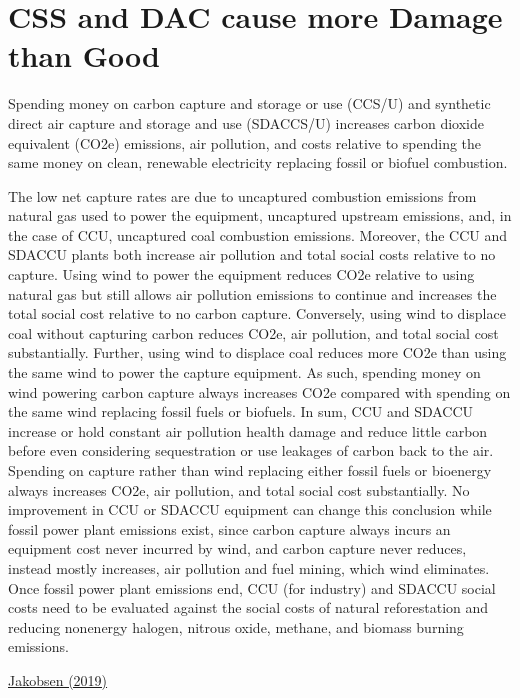 \documentclass[
]{book}
\begin{document}
\hypertarget{css-and-dac-cause-more-damage-than-good}{%
\section{CSS and DAC cause more Damage than Good}\label{css-and-dac-cause-more-damage-than-good}}

Spending money on carbon capture and storage or use (CCS/U) and synthetic direct air capture and storage and use (SDACCS/U) increases carbon dioxide equivalent (CO2e) emissions, air pollution, and costs relative to spending the same money on clean, renewable electricity replacing fossil or biofuel combustion.

The low net capture rates are due to uncaptured combustion emissions from natural gas used to power the equipment, uncaptured upstream emissions, and, in the case of CCU, uncaptured coal combustion emissions. Moreover, the CCU and SDACCU plants both increase air pollution and total social costs relative to no capture. Using wind to power the equipment reduces CO2e relative to using natural gas but still allows air pollution emissions to continue and increases the total social cost relative to no carbon capture. Conversely, using wind to displace coal without capturing carbon reduces CO2e, air pollution, and total social cost substantially. Further, using wind to displace coal reduces more CO2e than using the same wind to power the capture equipment. As such, spending money on wind powering carbon capture always increases CO2e compared with spending on the same wind replacing fossil fuels or biofuels. In sum, CCU and SDACCU increase or hold constant air pollution health damage and reduce little carbon before even considering sequestration or use leakages of carbon back to the air. Spending on capture rather than wind replacing either fossil fuels or bioenergy always increases CO2e, air pollution, and total social cost substantially. No improvement in CCU or SDACCU equipment can change this conclusion while fossil power plant emissions exist, since carbon capture always incurs an equipment cost never incurred by wind, and carbon capture never reduces, instead mostly increases, air pollution and fuel mining, which wind eliminates. Once fossil power plant emissions end, CCU (for industry) and SDACCU social costs need to be evaluated against the social costs of natural reforestation and reducing nonenergy halogen, nitrous oxide, methane, and biomass burning emissions.

\href{https://research.american.edu/carbonremoval/2019/11/13/jacobson-mark-2019-why-carbon-capture-and-direct-air-capture-cause-more-damage-than-good-to-climate-and-health/}{Jakobsen (2019)}
\end{document}

